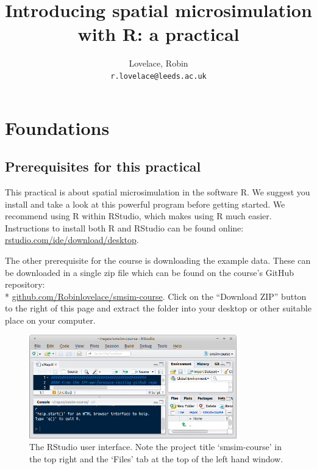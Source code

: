 \documentclass[a4paper, 11pt, twoside]{article}
\begin{document}
 
\title{Introducing spatial microsimulation with R: a practical}
\pagestyle{myheadings}
\author{Lovelace, Robin\\
\texttt{r.lovelace@leeds.ac.uk}}
\maketitle

\tableofcontents

\newpage
\section{Foundations}

\subsection{Prerequisites for this practical}

This practical is about spatial microsimulation in the software
R. We suggest you install and take a look at this powerful program
before getting started. We recommend using R within RStudio, which makes
using R much easier. Instructions to install both R and RStudio can be found
online: \href{http://www.rstudio.com/ide/download/desktop}{rstudio.com/ide/download/desktop}.

The other prerequisite for the course is downloading the example data.
These can be downloaded in a single zip file which can be found on the
course's GitHub repository: \\*
\href{https://github.com/Robinlovelace/smsim-course}{github.com/Robinlovelace/smsim-course}.
Click on the ``Download ZIP'' button to the right of this page and extract
the folder into your desktop or other suitable place on your computer.

\begin{figure}
\begin{center}
   \includegraphics[width=9cm]{rstudio}
\end{center}
 \caption{The RStudio user interface. Note the project title `smsim-course' in
the top right and the `Files' tab at the top of the left hand window.}
\label{frstudio}
\end{figure}
\end{document}
